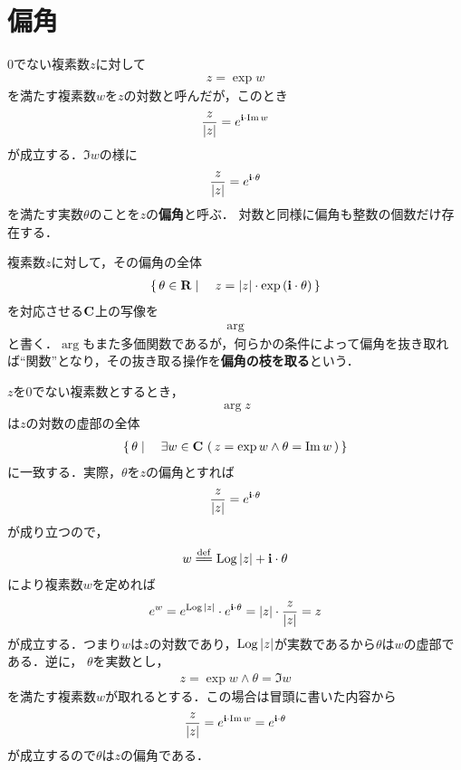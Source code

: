 \section{偏角}
	
	$0$でない複素数$z$に対して
	\begin{align}
		z = \exp{w}
	\end{align}
	を満たす複素数$w$を$z$の対数と呼んだが，このとき
	\begin{align}
		\frac{z}{|z|} = e^{\mathbf{i} \cdot \operatorname{Im} w}
	\end{align}
	が成立する．$\Im{w}$の様に
	\begin{align}
		\frac{z}{|z|} = e^{\mathbf{i} \cdot \theta}
	\end{align}
	を満たす実数$\theta$のことを$z$の{\bf 偏角}と呼ぶ．
	対数と同様に偏角も整数の個数だけ存在する．
	
	\begin{screen}
		\begin{dfn}[偏角]
			複素数$z$に対して，その偏角の全体
			\begin{align}
				\left\{\, \theta \in \mathbf{R} \mid \quad z = |z| \cdot \exp{(\mathbf{i}\cdot \theta)}\, \right\}
			\end{align}
			を対応させる$\mathbf{C}$上の写像を
			\begin{align}
				\arg
			\end{align}
			と書く．$\arg$もまた多価関数であるが，何らかの条件によって偏角を抜き取れば``関数''となり，その抜き取る操作を{\bf 偏角の枝を取る}という．
		\end{dfn}
	\end{screen}
	
	$z$を$0$でない複素数とするとき，
	\begin{align}
		\arg{z}
	\end{align}
	は$z$の対数の虚部の全体
	\begin{align}
		\left\{\, \theta \mid \quad \exists w \in \mathbf{C}\, \left(\, z = \exp{w} \wedge \theta = \operatorname{Im} w\, \right)\, \right\}
	\end{align}
	に一致する．実際，$\theta$を$z$の偏角とすれば
	\begin{align}
		\frac{z}{|z|} = e^{\mathbf{i} \cdot \theta}
	\end{align}
	が成り立つので，
	\begin{align}
		w \defeq \pvlog{|z|} + \isym \cdot \theta
	\end{align}
	により複素数$w$を定めれば
	\begin{align}
		e^{w} = e^{\operatorname{Log}{|z|}} \cdot e^{\mathbf{i} \cdot \theta} = |z| \cdot \frac{z}{|z|} = z
	\end{align}
	が成立する．つまり$w$は$z$の対数であり，$\operatorname{Log}{|z|}$が実数であるから$\theta$は$w$の虚部である．逆に，
	$\theta$を実数とし，
	\begin{align}
		z = \exp{w} \wedge \theta = \Im{w}
	\end{align}
	を満たす複素数$w$が取れるとする．この場合は冒頭に書いた内容から
	\begin{align}
		\frac{z}{|z|} = e^{\mathbf{i} \cdot \operatorname{Im} w} = e^{\mathbf{i} \cdot \theta}
	\end{align}
	が成立するので$\theta$は$z$の偏角である．
	
